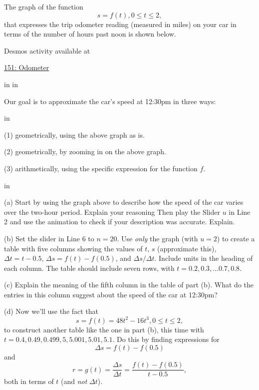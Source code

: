 \documentclass{ximera}
\newcommand{\pskip}{\vskip 0.1 in}
\begin{document}
\begin{example}
The graph of the function
\[
    s = f(t) , 0\leq t \leq 2 ,
\]
that expresses the trip odometer reading (measured in miles) on your car in terms of the number of hours past noon is shown below.

 
\begin{onlineOnly}
    \begin{center}
\end{center}
\end{onlineOnly}

Desmos activity available at

\href{https://www.desmos.com/calculator/tumgpu4n0w}{151: Odometer}

\pskip \pskip

Our goal is to approximate the car's speed at 12:30pm in three ways:

\pskip

(1) geometrically, using the above graph as is.

(2) geometrically, by zooming in on the above graph.

(3) arithmetically, using the specific expression for the function $f$.


\pskip

(a) Start by using the graph above to describe how the speed of the car varies over the two-hour period. Explain your reasoning Then play the Slider $u$ in Line 2 and use the animation to check if your description was accurate. Explain.

(b) Set the slider in Line 6 to $n=20$. Use \emph{only} the graph (with $u=2$) to create a table with five columns showing the values of $t$, $s$ (approximate this), $\Delta t = t-0.5$, $\Delta s=f(t)-f(0.5)$, and $\Delta s / \Delta t$. Include units in the heading of each column. The table should include seven rows, with $t=0.2, 0.3, \ldots 0.7, 0.8$. 

(c) Explain the meaning of the fifth column in the table of part (b). What do the entries in this column suggest about the speed of the car at 12:30pm?

(d) Now we'll use the fact that
\[
   s = f(t) = 48t^2 - 16t^3, 0 \leq t \leq 2 ,
\]
to construct another table like the one in part (b), this time with $t=0.4, 0.49, 0.499, 5, 5.001, 5.01, 5.1$. Do this by finding expressions for 
\[
    \Delta s = f(t) - f(0.5)
\]
and
\[
   r = g(t) = \frac{\Delta s}{\Delta t} = \frac{f(t) - f(0.5)}{t-0.5} ,
\]
both in terms of $t$ (and \emph{not} $\Delta t$).



\end{example}
\end{document}
